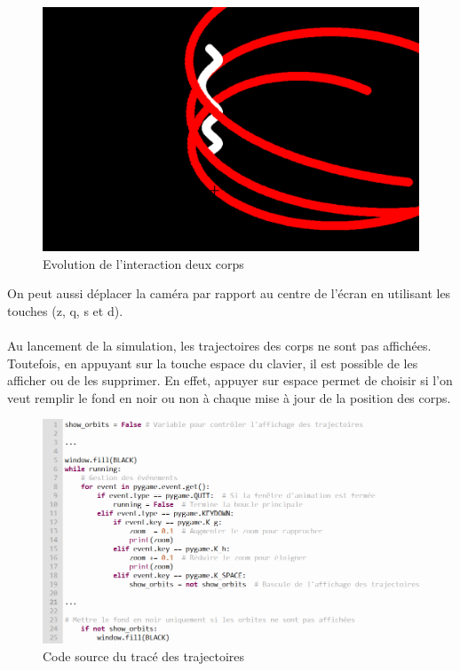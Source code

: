 \documentclass[a4paper, 12pt]{article}
\begin{document}
\begin{figure}[H]
\begin{minipage}{0.2\linewidth}
    	\end{minipage}
    	\hspace{0.05\linewidth}  %
    	\begin{minipage}{0.2\linewidth}
        	\centering
        	\includegraphics[width=\linewidth]{img/interactionDeuxCorps2.png}
        	\caption{\label{fig:DeuxCorps3} Evolution de l'interaction deux corps} 
    	\end{minipage}
	\end{figure} 

On peut aussi déplacer la caméra par rapport au centre de l'écran en utilisant les touches (z, q, s et d).
\paragraph{}
Au lancement de la simulation, les trajectoires des corps ne sont pas affichées. Toutefois, en appuyant sur la touche espace du clavier, il est possible de les afficher ou de les supprimer. En effet, appuyer sur espace permet de choisir si l'on veut remplir le fond en noir ou non à chaque mise à jour de la position des corps.

\begin{figure}[H]
		\centering
		\includegraphics[width=0.4\linewidth]{img/codeTrajectoire.png}
		\caption{\label{fig: Source} Code source du tracé des trajectoires}  
	\end{figure}
\end{document}
